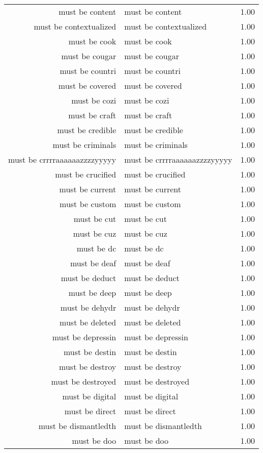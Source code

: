 \begin{table}[ht]
\begin{tabular}{rlr}
  must be content & must be content & 1.00 \\ 
  must be contextualized & must be contextualized & 1.00 \\ 
  must be cook & must be cook & 1.00 \\ 
  must be cougar & must be cougar & 1.00 \\ 
  must be countri & must be countri & 1.00 \\ 
  must be covered & must be covered & 1.00 \\ 
  must be cozi & must be cozi & 1.00 \\ 
  must be craft & must be craft & 1.00 \\ 
  must be credible & must be credible & 1.00 \\ 
  must be criminals & must be criminals & 1.00 \\ 
  must be crrrraaaaaazzzzyyyyy & must be crrrraaaaaazzzzyyyyy & 1.00 \\ 
  must be crucified & must be crucified & 1.00 \\ 
  must be current & must be current & 1.00 \\ 
  must be custom & must be custom & 1.00 \\ 
  must be cut & must be cut & 1.00 \\ 
  must be cuz & must be cuz & 1.00 \\ 
  must be dc & must be dc & 1.00 \\ 
  must be deaf & must be deaf & 1.00 \\ 
  must be deduct & must be deduct & 1.00 \\ 
  must be deep & must be deep & 1.00 \\ 
  must be dehydr & must be dehydr & 1.00 \\ 
  must be deleted & must be deleted & 1.00 \\ 
  must be depressin & must be depressin & 1.00 \\ 
  must be destin & must be destin & 1.00 \\ 
  must be destroy & must be destroy & 1.00 \\ 
  must be destroyed & must be destroyed & 1.00 \\ 
  must be digital & must be digital & 1.00 \\ 
  must be direct & must be direct & 1.00 \\ 
  must be dismantledth & must be dismantledth & 1.00 \\ 
  must be doo & must be doo & 1.00 \\ 

\end{tabular}
\end{table}
